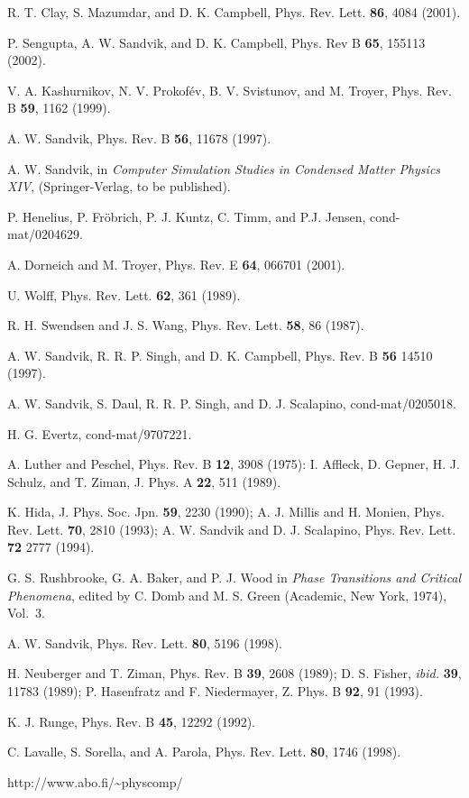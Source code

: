\documentclass[10pt,pre,aps,twocolumn,showpacs,superscriptaddress,
floatfix]{revtex4}
\begin{document}
\begin{thebibliography}{00}
R. T. Clay, S. Mazumdar, and D. K. Campbell, Phys. Rev. Lett. {\bf 86},
4084 (2001).

P. Sengupta, A. W. Sandvik, and D. K. Campbell, Phys. Rev B {\bf 65}, 155113 
(2002).

V. A. Kashurnikov, N. V. Prokof\'ev,  B. V. Svistunov, and M. Troyer,
Phys. Rev. B {\bf 59}, 1162 (1999).

A. W. Sandvik, Phys. Rev. B {\bf 56}, 11678 (1997).

A. W. Sandvik, in {\it Computer Simulation Studies in Condensed Matter 
Physics XIV}, (Springer-Verlag, to be published).

P. Henelius, P. Fr\"obrich, P. J. Kuntz, C. Timm, and P.J. Jensen,
cond-mat/0204629.

A. Dorneich and M. Troyer, Phys. Rev. E {\bf 64}, 066701 (2001).

U. Wolff, Phys. Rev. Lett. {\bf 62}, 361 (1989).

R. H. Swendsen and J. S. Wang, Phys. Rev. Lett. {\bf 58}, 86 (1987).

A. W. Sandvik, R. R. P. Singh, and D. K. Campbell, Phys. Rev. B {\bf 56} 
14510 (1997).

A. W. Sandvik, S. Daul, R. R. P. Singh, and D. J. Scalapino,
cond-mat/0205018.

H. G. Evertz, cond-mat/9707221.

A. Luther and Peschel, Phys. Rev. B {\bf 12}, 3908 (1975): I. Affleck,
D. Gepner, H. J. Schulz, and T. Ziman, J. Phys. A {\bf 22}, 511 (1989).

K. Hida, J. Phys. Soc. Jpn. {\bf 59}, 2230 (1990);
A. J. Millis and H. Monien, Phys. Rev. Lett. {\bf 70}, 2810 (1993);
A. W. Sandvik and D. J. Scalapino, Phys. Rev. Lett. {\bf 72} 2777 (1994).

G. S. Rushbrooke, G. A. Baker, and  P. J. Wood in {\it Phase Transitions and 
Critical Phenomena}, edited by C. Domb and M. S. Green (Academic, New York,
1974), Vol.~3.

A. W. Sandvik, Phys. Rev. Lett. {\bf 80}, 5196 (1998). 

H. Neuberger and T. Ziman, Phys. Rev. B {\bf 39}, 2608 (1989);
D. S. Fisher, {\it ibid.} {\bf 39}, 11783 (1989); P. Hasenfratz and 
F. Niedermayer, Z. Phys. B {\bf 92}, 91 (1993).

K. J. Runge, Phys. Rev. B {\bf 45}, 12292 (1992).

C. Lavalle, S. Sorella, and A. Parola, Phys. Rev. Lett. {\bf 80}, 1746 (1998).

 http://www.abo.fi/\~{ }physcomp/

\end{thebibliography}
\end{document}
